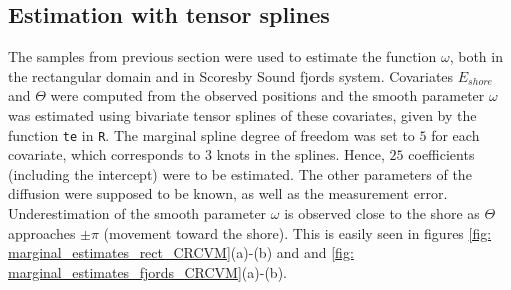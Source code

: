 \documentclass[11pt]{article}
\newcommand {\1}{\mathbb{1}}
\begin{document}

\subsection{Estimation with tensor splines}



The samples from previous section were used to estimate the function $\omega$, both in the rectangular domain and in Scoresby Sound fjords system. Covariates $E_{shore}$ and $\Theta$ were computed from the observed positions and the smooth parameter $\omega$ was estimated using bivariate tensor splines of these covariates, given by the function \texttt{te} in \texttt{R}. The marginal spline degree of freedom was set to $5$ for each covariate, which corresponds to $3$ knots in the splines. Hence, $25$ coefficients (including the intercept) were to be estimated. The other parameters of the diffusion were supposed to be known, as well as the measurement error. Underestimation of the smooth parameter $\omega$ is observed close to the shore as $\Theta$ approaches $\pm \pi$ (movement toward the shore). This is easily seen in figures \ref{fig: marginal_estimates_rect_CRCVM}(a)-(b) and and \ref{fig: marginal_estimates_fjords_CRCVM}(a)-(b).
\end{document}
